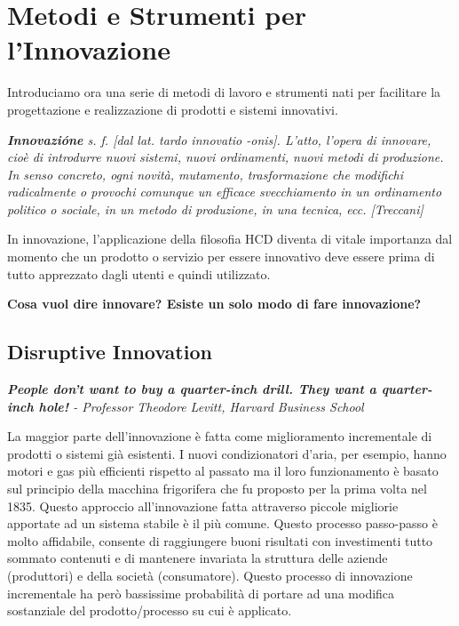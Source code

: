 \chapter{Metodi e Strumenti per l'Innovazione}

Introduciamo ora una serie di metodi di lavoro e strumenti nati per facilitare la progettazione e realizzazione di prodotti e sistemi innovativi. 

\begin{flushleft}
\textit{ \textbf{Innovazióne} s. f. [dal lat. tardo innovatio -onis]. L’atto, l’opera di innovare, cioè di introdurre nuovi sistemi, nuovi ordinamenti, nuovi metodi di produzione. In senso concreto, ogni novità, mutamento, trasformazione che modifichi radicalmente o provochi comunque un efficace svecchiamento in un ordinamento politico o sociale, in un metodo di produzione, in una tecnica, ecc. [Treccani]}
\end{flushleft}

In innovazione, l'applicazione della filosofia HCD diventa di vitale importanza dal momento che un prodotto o servizio per essere innovativo deve essere prima di tutto apprezzato dagli utenti e quindi utilizzato.

\textbf{Cosa vuol dire innovare? Esiste un solo modo di fare innovazione?}

\section{Disruptive Innovation}
\begin{flushleft}
	\textit{\textbf{People don’t want to buy a quarter-inch drill. They want a quarter-inch hole!} - Professor Theodore Levitt, Harvard Business School}\\

\end{flushleft}

La maggior parte dell'innovazione è fatta come miglioramento incrementale di prodotti o sistemi già esistenti. I nuovi condizionatori d'aria, per esempio, hanno motori e gas più efficienti rispetto al passato ma il loro funzionamento è basato sul principio della macchina frigorifera che fu proposto per la prima volta nel 1835.
Questo approccio all'innovazione fatta attraverso piccole migliorie apportate ad un sistema stabile è il più comune. Questo processo passo-passo è molto affidabile, consente di raggiungere buoni risultati con investimenti tutto sommato contenuti e di mantenere invariata la struttura delle aziende (produttori) e della società (consumatore). Questo processo di innovazione incrementale ha però bassissime probabilità di portare ad una modifica sostanziale del prodotto/processo su cui è applicato.

